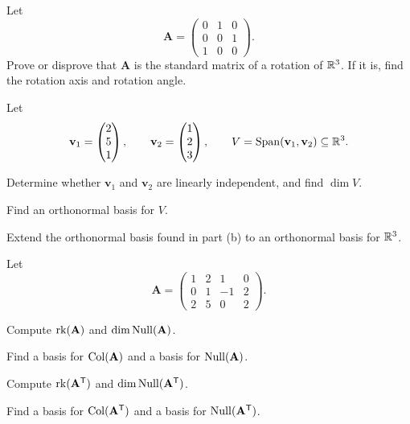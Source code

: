 \begin{problem}
Let
\[
\mathbf A=
\begin{pmatrix}
0&1&0\\
0&0&1\\
1&0&0
\end{pmatrix}.
\]
Prove or disprove that $\mathbf A$ is the standard matrix of a rotation of $\mathbb{R}^3$. If it is, find the rotation axis and rotation angle.
\end{problem}

\begin{problem}
Let
\[
\mathbf v_1=\begin{pmatrix}2\\5\\1\end{pmatrix},
\qquad
\mathbf v_2=\begin{pmatrix}1\\2\\3\end{pmatrix},
\qquad
V=\operatorname{Span}(\mathbf v_1,\mathbf v_2)\subseteq\mathbb{R}^3.
\]
\begin{problemsubparts}
\item Determine whether $\mathbf v_1$ and $\mathbf v_2$ are linearly independent, and find $\dim V$.
\item Find an orthonormal basis for $V$.
\item Extend the orthonormal basis found in part \textup{(b)} to an orthonormal basis for $\mathbb{R}^3$.
\end{problemsubparts}
\end{problem}

\begin{problem}
Let
\[
\mathbf A=
\begin{pmatrix}
1&2&1&0\\
0&1&-1&2\\
2&5&0&2
\end{pmatrix}.
\]
\begin{problemsubparts}
\item Compute $\operatorname{rk}(\mathbf A)$ and $\dim\operatorname{Null}(\mathbf A)$.
\item Find a basis for $\operatorname{Col}(\mathbf A)$ and a basis for $\operatorname{Null}(\mathbf A)$.
\item Compute $\operatorname{rk}(\mathbf A^{\mathsf T})$ and $\dim\operatorname{Null}(\mathbf A^{\mathsf T})$.
\item Find a basis for $\operatorname{Col}(\mathbf A^{\mathsf T})$ and a basis for $\operatorname{Null}(\mathbf A^{\mathsf T})$.
\end{problemsubparts}
\end{problem}

